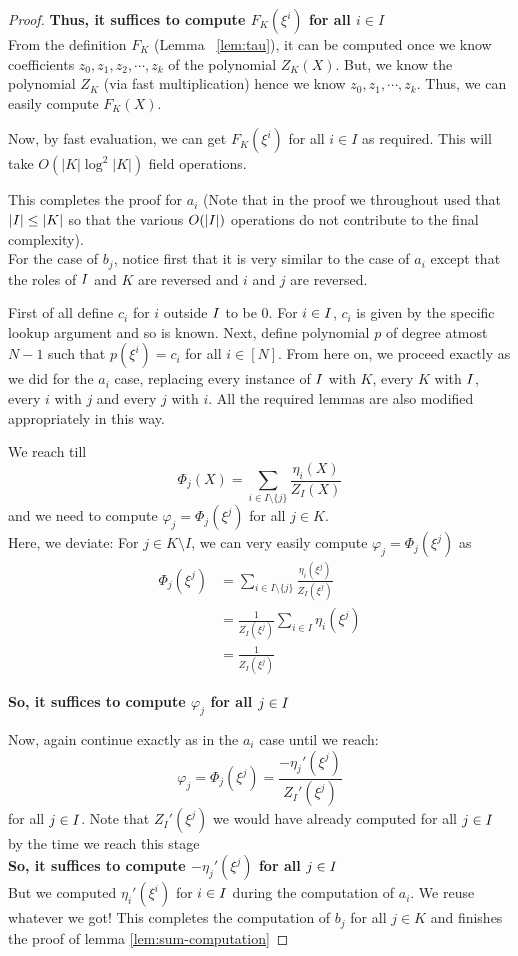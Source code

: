 \begin{proof}
    \textbf{Thus, it suffices to compute $F_K(\xi^i)$ for all $i \in I$}\\

    From the definition $F_K$ (Lemma ~\ref{lem:tau}), it can be computed once we know
    coefficients  $z_0, z_1, z_2, \cdots, z_k$ of the polynomial $Z_K(X)$.
    But, we know the polynomial $Z_K$ (via fast multiplication) hence we know $z_0, z_1, \cdots, z_{k}$. Thus, we can easily compute $F_K(X)$.

    Now, by fast evaluation, we can get $F_K(\xi^i)$ for all $i \in I$ as required. This will take $O(|K| \log^2|K|)$ field operations.


    This completes the proof for $a_i$ (Note that in the proof we throughout used that $|I| \leq |K|$ so that the various $O(|I|)$ operations do not contribute to the final complexity).\\
    For the case of $b_j$, notice first that it is very similar to the case of $a_i$ except that the roles of $I$ and $K$ are reversed and $i$ and $j$ are reversed.

    First of all define $c_i$ for $i$ outside $I$ to be 0. For $i \in I$, $c_i$ is given by the specific lookup argument and so is known.
    Next, define polynomial $p$ of degree atmost $N-1$ such that $p(\xi^i)=c_i$ for all $i \in [N]$.
    From here on, we proceed exactly as we did for the $a_i$ case, replacing every instance of $I$ with $K$, every $K$ with $I$, every $i$ with $j$ and every $j$ with $i$.
    All the required lemmas are also modified appropriately in this way.

    We reach till
    $$\Phi_j(X)=\sum_{i\in I\setminus \{j\}} \frac{\eta_i(X)}{Z_I(X)}$$
    and we need to compute $\varphi_j=\Phi_j(\xi^j)$ for all $j \in K$.\\

    Here, we deviate: For $j \in K\setminus I$, we can very easily compute $\varphi_j=\Phi_j(\xi^j)$ as
    \begin{align*}
        \Phi_j(\xi^j)&=\sum_{i\in I\setminus \{j\}} \frac{\eta_i(\xi^j)}{Z_I(\xi^j)}\\
        &=\frac{1}{Z_I(\xi^j)} \sum_{i\in I}\eta_i(\xi^j)\\
        &=\frac{1}{Z_I(\xi^j)}
    \end{align*}

    \textbf{So, it suffices to compute $\varphi_j$ for all $j \in I$}

    Now, again continue exactly as in the $a_i$ case until we reach:
    $$\varphi_j =\Phi_j(\xi^j) = \frac{-\eta_j'(\xi^j)}{Z_I'(\xi^j)}$$
    for all $j \in I$.
    Note that $Z_I'(\xi^j)$ we would have already computed for all $j \in I$ by the time we reach this stage \\
    \textbf{So, it suffices to compute $-\eta_j'(\xi^j)$ for all $j \in I$\\}
    But we computed $\eta_i'(\xi^i)$ for $i\in I$ during the computation of $a_i$. We reuse whatever we got!
    This completes the computation of $b_j$ for all $j \in K$
    and finishes the proof of lemma \ref{lem:sum-computation}
\end{proof}


